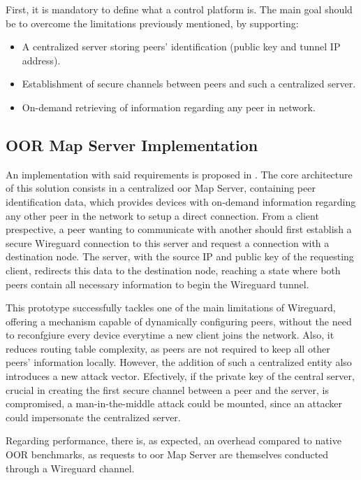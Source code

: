 \documentclass[11pt,twoside,a4paper]{report}
\begin{document}
First, it is mandatory to define what a control platform is. The main goal should be to overcome the limitations previously mentioned, by supporting:

\begin{itemize}
     \item A centralized server storing peers' identification (public key and tunnel IP address).
     \item Establishment of secure channels between peers and such a centralized server.
     \item On-demand retrieving of information regarding any peer in network.
\end{itemize}

\subsection{OOR Map Server Implementation}

An implementation with said requirements is proposed in \cite{paillisse2021control}. The core architecture of this solution consists in a centralized \acrlong{oor} Map Server, containing peer identification data, which provides devices with on-demand information regarding any other peer in the network to setup a direct connection.  From a client prespective, a peer wanting to communicate with another should first establish a secure Wireguard connection to this server and request a connection with a destination node. The server, with the source IP and public key of the requesting client, redirects this data to the destination node, reaching a state where both peers contain all necessary information to begin the Wireguard tunnel.

This prototype successfully tackles one of the main limitations of Wireguard, offering a mechanism capable of dynamically configuring peers, without the need to reconfgiure every device everytime a new client joins the network. Also, it reduces routing table complexity, as peers are not required to keep all other peers' information locally. However, the addition of such a centralized entity also introduces a new attack vector. Efectively, if the private key of the central server, crucial in creating the first secure channel between a peer and the server, is compromised, a man-in-the-middle attack could be mounted, since an attacker could impersonate the centralized server.

Regarding performance, there is, as expected, an overhead compared to native OOR benchmarks, as requests to \acrshort{oor} Map Server are themselves conducted through a Wireguard channel.
\end{document}
